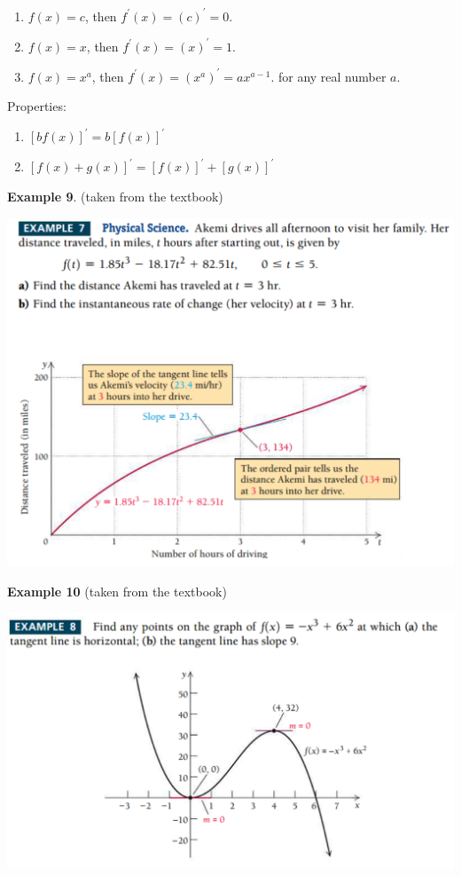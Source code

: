 \documentclass[
]{book}
\begin{document}
\begin{enumerate}
\def\labelenumi{\arabic{enumi}.}
\item
  \(f(x) = c\), then \(f^\prime(x) = (c)^\prime = 0\).
\item
  \(f(x) = x\), then \(f^\prime(x) = (x)^\prime = 1\).
\item
  \(f(x) = x^a\), then \(f^\prime(x) = (x^a)^\prime = ax^{a-1}\). for any real number \(a\).
\end{enumerate}

Properties:

\begin{enumerate}
\def\labelenumi{\arabic{enumi}.}
\item
  \([bf(x)]^\prime = b[f(x)]^\prime\)
\item
  \([f(x) + g(x)]^\prime = [f(x)]^\prime + [g(x)]^\prime\)
\end{enumerate}

\hfill\break

\textbf{Example 9}. (taken from the textbook)

\begin{center}\includegraphics[width=0.75\linewidth]{img02/w02-example9} \end{center}

\hfill\break

\textbf{Example 10} (taken from the textbook)

\begin{center}\includegraphics[width=0.75\linewidth]{img02/w02-example10-1} \end{center}
\end{document}
